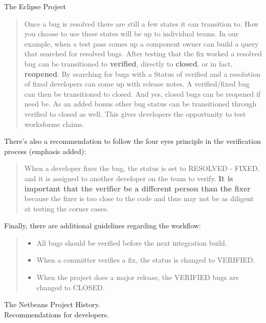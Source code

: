 \begin{subsection}{The Eclipse Project}
\begin{quote}
Once a bug is resolved there are still a few states it can transition to. How you choose to use these states will be up to individual teams. In our example, when a test pass comes up a component owner can build a query that searched for resolved bugs. After testing that the fix worked a resolved bug can be transitioned to \textbf{verified}, directly to \textbf{closed}, or in fact, \textbf{reopened}. By searching for bugs with a Status of verified and a resolution of fixed developers can come up with release notes. A verified/fixed bug can then be transitioned to closed. And yes, closed bugs can be reopened if need be. As an added bonus other bug status can be transitioned through verified to closed as well. This gives developers the opportunity to test worksforme claims.
\end{quote}

There’s also a recommendation to follow the four eyes principle in the verification process (emphasis added):

\begin{quote}
When a developer fixes the bug, the status is set to RESOLVED - FIXED, and it is assigned to another developer on the team to verify. \textbf{It is important that the verifier be a different person than the fixer} because the fixer is too close to the code and thus may not be as diligent at testing the corner cases.
\end{quote}

Finally, there are additional guidelines regarding the workflow:

\begin{quote}
	\begin{itemize}
\item All bugs should be verified before the next integration build.

\item When a committer verifies a fix, the status is changed to VERIFIED.

\item When the project does a major release, the VERIFIED bugs are changed to CLOSED.
	\end{itemize}
\end{quote}
\end{subsection}

  \begin{subsection}{The Netbeans Project}
History. \\
Recommendations for developers.
\end{subsection}

